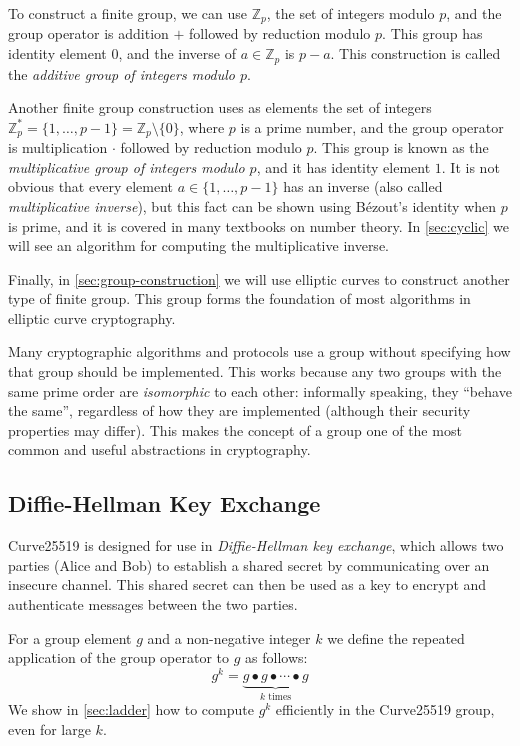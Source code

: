 \documentclass{article}
\begin{document}
To construct a finite group, we can use $\mathbb{Z}_p$, the set of integers modulo $p$, and the group operator is addition $+$ followed by reduction modulo $p$.
This group has identity element $0$, and the inverse of $a \in \mathbb{Z}_p$ is $p-a$.
This construction is called the \emph{additive group of integers modulo $p$}.

Another finite group construction uses as elements the set of integers $\mathbb{Z}_p^* = \{1,\dots, p-1\} = \mathbb{Z}_p \setminus \{0\}$, where $p$ is a prime number, and the group operator is multiplication $\cdot$ followed by reduction modulo $p$.
This group is known as the \emph{multiplicative group of integers modulo $p$}, and it has identity element $1$.
It is not obvious that every element $a \in \{1,\dots, p-1\}$ has an inverse (also called \emph{multiplicative inverse}), but this fact can be shown using Bézout's identity when $p$ is prime, and it is covered in many textbooks on number theory.
In \autoref{sec:cyclic} we will see an algorithm for computing the multiplicative inverse.

Finally, in \autoref{sec:group-construction} we will use elliptic curves to construct another type of finite group.
This group forms the foundation of most algorithms in elliptic curve cryptography.

Many cryptographic algorithms and protocols use a group without specifying how that group should be implemented.
This works because any two groups with the same prime order are \emph{isomorphic} to each other: informally speaking, they ``behave the same'', regardless of how they are implemented (although their security properties may differ).
This makes the concept of a group one of the most common and useful abstractions in cryptography.

\subsection{Diffie-Hellman Key Exchange}\label{sec:diffie-hellman}

Curve25519 is designed for use in \emph{Diffie-Hellman key exchange}, which allows two parties (Alice and Bob) to establish a shared secret by communicating over an insecure channel.
This shared secret can then be used as a key to encrypt and authenticate messages between the two parties.

For a group element $g$ and a non-negative integer $k$ we define the repeated application of the group operator to $g$ as follows:
\begin{equation}\label{eq:power}
g^k = \underbrace{g \bullet g \bullet \cdots \bullet g}_\text{$k$ times}
\end{equation}
We show in \autoref{sec:ladder} how to compute $g^k$ efficiently in the Curve25519 group, even for large $k$.
\end{document}
